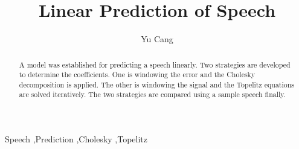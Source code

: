 \documentclass[preprint,12pt]{elsarticle}
\begin{document}
\begin{frontmatter}



\title{Linear Prediction of Speech}


\author{Yu Cang}
\address{Shanghai Jiao Tong University, China}

\begin{abstract}
A model was established for predicting a speech linearly. Two strategies are developed to determine the coefficients. One is windowing the error and the Cholesky decomposition is applied. The other is windowing the signal and the Topelitz equations are solved iteratively. The two strategies are compared using a sample speech finally.
\end{abstract}

\begin{keyword}
Speech \sep Prediction \sep Cholesky \sep Topelitz


\end{keyword}

\end{frontmatter}

\linenumbers

\end{document}
